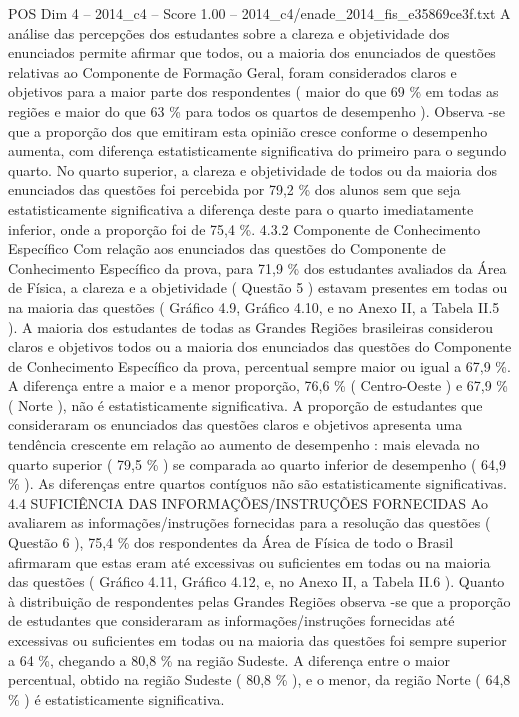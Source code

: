 \begin{textsample}{POS Dim 4 – 2014\_c4 – Score 1.00 – 2014\_c4/enade\_2014\_fis\_e35869ce3f.txt}
A análise das percepções dos estudantes sobre a clareza e objetividade dos enunciados permite afirmar que todos, ou a maioria dos enunciados de questões relativas ao Componente de Formação Geral, foram considerados claros e objetivos para a maior parte dos respondentes ( maior do que 69 \% em todas as regiões e maior do que 63 \% para todos os quartos de desempenho ).
Observa -se que a proporção dos que emitiram esta opinião cresce conforme o desempenho aumenta, com diferença estatisticamente significativa do primeiro para o segundo quarto.
No quarto superior, a clareza e objetividade de todos ou da maioria dos enunciados das questões foi percebida por 79,2 \% dos alunos sem que seja estatisticamente significativa a diferença deste para o quarto imediatamente inferior, onde a proporção foi de 75,4 \%. 4.3.2 Componente de Conhecimento Específico Com relação aos enunciados das questões do Componente de Conhecimento Específico da prova, para 71,9 \% dos estudantes avaliados da Área de Física, a clareza e a objetividade ( Questão 5 ) estavam presentes em todas ou na maioria das questões ( Gráfico 4.9, Gráfico 4.10, e no Anexo II, a Tabela II.5 ).
A maioria dos estudantes de todas as Grandes Regiões brasileiras considerou claros e objetivos todos ou a maioria dos enunciados das questões do Componente de Conhecimento Específico da prova, percentual sempre maior ou igual a 67,9 \%.
A diferença entre a maior e a menor proporção, 76,6 \% ( Centro-Oeste ) e 67,9 \% ( Norte ), não é estatisticamente significativa.
A proporção de estudantes que consideraram os enunciados das questões claros e objetivos apresenta uma tendência crescente em relação ao aumento de desempenho : mais elevada no quarto superior ( 79,5 \% ) se comparada ao quarto inferior de desempenho ( 64,9 \% ).
As diferenças entre quartos contíguos não são estatisticamente significativas. 4.4 SUFICIÊNCIA DAS INFORMAÇÕES/INSTRUÇÕES FORNECIDAS Ao avaliarem as informações/instruções fornecidas para a resolução das questões ( Questão 6 ), 75,4 \% dos respondentes da Área de Física de todo o Brasil afirmaram que estas eram até excessivas ou suficientes em todas ou na maioria das questões ( Gráfico 4.11, Gráfico 4.12, e, no Anexo II, a Tabela II.6 ).
Quanto à distribuição de respondentes pelas Grandes Regiões observa -se que a proporção de estudantes que consideraram as informações/instruções fornecidas até excessivas ou suficientes em todas ou na maioria das questões foi sempre superior a 64 \%, chegando a 80,8 \% na região Sudeste.
A diferença entre o maior percentual, obtido na região Sudeste ( 80,8 \% ), e o menor, da região Norte ( 64,8 \% ) é estatisticamente significativa.

\end{textsample}

